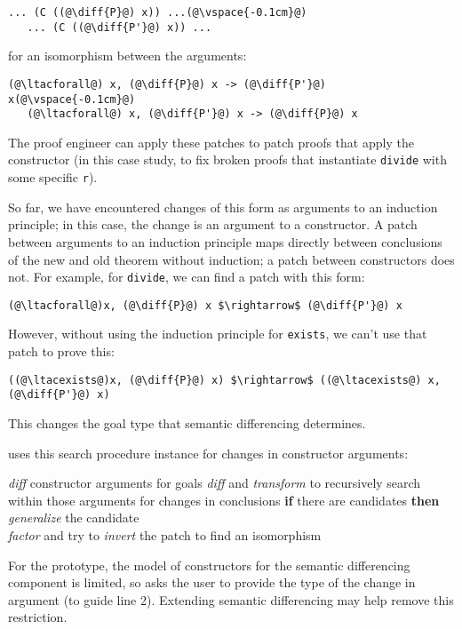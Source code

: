 \begin{lstlisting}[language=coq]
   ... (C ((@\diff{P}@) x)) ...(@\vspace{-0.1cm}@)
   ... (C ((@\diff{P'}@) x)) ...
\end{lstlisting}
for an isomorphism between the arguments:

\begin{lstlisting}[language=coq]
   (@\ltacforall@) x, (@\diff{P}@) x -> (@\diff{P'}@) x(@\vspace{-0.1cm}@)
   (@\ltacforall@) x, (@\diff{P'}@) x -> (@\diff{P}@) x
\end{lstlisting}
The proof engineer can apply these patches to patch proofs that apply the constructor (in this case study,
to fix broken proofs that instantiate \lstinline{divide} with some specific \lstinline{r}).

So far, we have encountered changes of this form as arguments to an 
induction principle; in this case, the change is an argument to a constructor.
A patch between arguments to an induction principle maps
directly between conclusions of the new and old theorem without
induction; a patch between constructors does not.
For example, for \lstinline{divide}, we can find a patch with this form:

\begin{lstlisting}[language=coq]
   (@\ltacforall@)x, (@\diff{P}@) x $\rightarrow$ (@\diff{P'}@) x
\end{lstlisting}
However, without using the induction principle for \lstinline{exists}, we can't use that patch to prove this:

\begin{lstlisting}[language=coq]
   ((@\ltacexists@)x, (@\diff{P}@) x) $\rightarrow$ ((@\ltacexists@) x, (@\diff{P'}@) x)
\end{lstlisting}
This changes the goal type that semantic differencing determines.

\sysname uses this search procedure instance for changes in constructor arguments:

\begin{algorithm}
\footnotesize
\begin{algorithmic}[1]
    \STATE \textit{diff} constructor arguments for goals
    \STATE \textit{diff} and \textit{transform} to recursively search within those arguments for changes in conclusions
    \STATE \textbf{if} there are candidates \textbf{then}
    \STATE \hspace*{1em} \textit{generalize} the candidate \\
           \hspace*{1em} \textit{factor} and try to \textit{invert} the patch to find an isomorphism
\end{algorithmic}
\end{algorithm}
For the prototype, the model of constructors for the semantic differencing component is limited,
so \sysname asks the user to provide the type of the change in argument (to guide line 2).
Extending semantic differencing may help remove this restriction.




